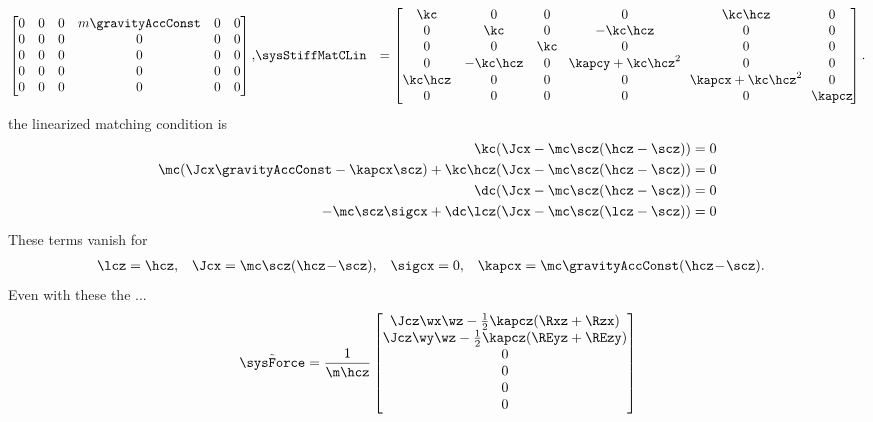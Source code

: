\begin{align*}
\begin{bmatrix}
  0 & 0 & 0 & m\gravityAccConst & 0 & 0 \\
  0 & 0 & 0 & 0 & 0 & 0 \\
  0 & 0 & 0 & 0 & 0 & 0 \\
  0 & 0 & 0 & 0 & 0 & 0 \\
  0 & 0 & 0 & 0 & 0 & 0 \\
  \end{bmatrix},&
 \sysStiffMatCLin &=
 \begin{bmatrix}
  \kc & 0 & 0 & 0 & \kc\hcz & 0 \\
  0 & \kc & 0 & -\kc\hcz & 0 & 0 \\
  0 & 0 & \kc & 0 & 0 & 0 \\
  0 & -\kc\hcz & 0 & \!\kapcy+\kc\hcz^2\! & 0 & 0 \\
  \kc\hcz & 0 & 0 & 0 & \!\kapcx+\kc\hcz^2\! & 0 \\
  0 & 0 & 0 & 0 & 0 & \!\kapcz\! \\
 \end{bmatrix}.
\end{align*}
the linearized matching condition is
\begin{subequations}
\begin{align}
 \kc(\Jcx - \mc\scz(\hcz - \scz)) &= 0
\\
 \mc(\Jcx\gravityAccConst - \kapcx\scz) + \kc\hcz(\Jcx - \mc\scz(\hcz - \scz)) &= 0
\\
 \dc(\Jcx - \mc\scz(\hcz - \scz)) &= 0
\\
 -\mc\scz\sigcx + \dc\lcz(\Jcx - \mc\scz(\lcz - \scz)) &= 0
\end{align} 
\end{subequations}
These terms vanish for
\begin{align}
 \lcz &= \hcz,&
 \Jcx &= \mc\scz(\hcz \!-\! \scz),&
 \sigcx &= 0,&
 \kapcx &= \mc\gravityAccConst(\hcz \!-\! \scz).
\end{align}
Even with these the ...
\begin{align}
 \tilde{\sysForce} = \frac{1}{\m\hcz}\begin{bmatrix} \Jcz\wx\wz - \tfrac{1}{2}\kapcz(\Rxz+\Rzx) \\ \Jcz\wy\wz - \tfrac{1}{2}\kapcz(\REyz+\REzy) \\ 0 \\ 0 \\ 0 \\ 0 \end{bmatrix}
\end{align}


